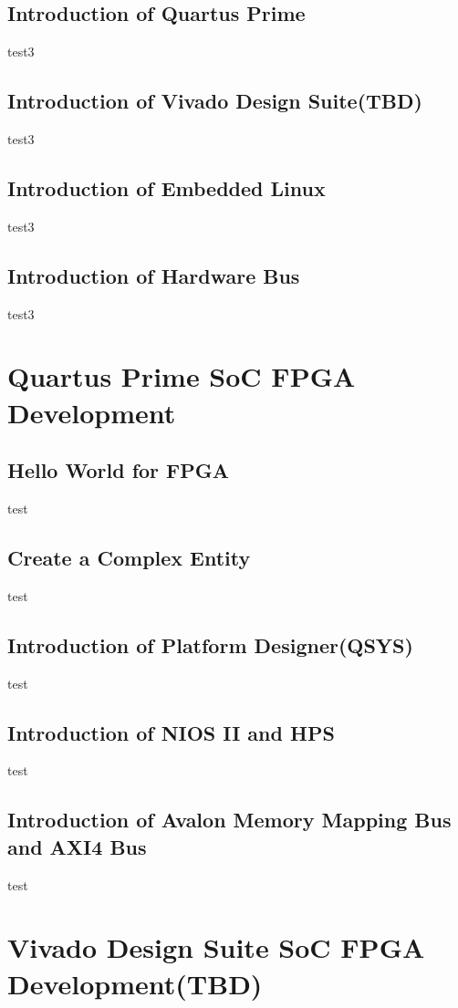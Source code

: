 \documentclass[12pt,article]{memoir}
\begin{document}
\section{Introduction of Quartus Prime}
test3
\section{Introduction of Vivado Design Suite(TBD)}
test3
\section{Introduction of Embedded Linux}
test3
\section{Introduction of Hardware Bus}
test3
\chapter{Quartus Prime SoC FPGA Development}
\section{Hello World for FPGA}
test
\section{Create a Complex Entity}
test
\section{Introduction of Platform Designer(QSYS)}
test
\section{Introduction of NIOS II and HPS}
test
\section{Introduction of Avalon Memory Mapping Bus and AXI4 Bus}
test
\chapter{Vivado Design Suite SoC FPGA Development(TBD)}


\end{document}

